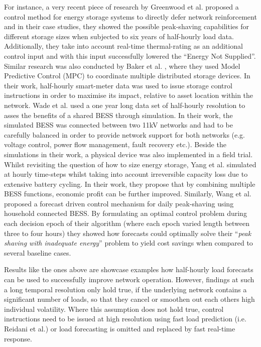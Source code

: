 For instance, a very recent piece of research by Greenwood et al. \cite{Greenwood2017} proposed a control method for energy storage systems to directly defer network reinforcement and in their case studies, they showed the possible peak-shaving capabilities for different storage sizes when subjected to six years of half-hourly load data.
Additionally, they take into account real-time thermal-rating as an additional control input and with this input successfully lowered the ``Energy Not Supplied''.
Similar research was also conducted by Baker et al. \cite{Baker2016a}, where they used Model Predictive Control (MPC) to coordinate multiple distributed storage devices.
In their work, half-hourly smart-meter data was used to issue storage control instructions in order to maximise its impact, relative to asset location within the network.
Wade et al. \cite{Wade2010} used a one year long data set of half-hourly resolution to asses the benefits of a shared BESS through simulation.
In their work, the simulated BESS was connected between two 11kV networks and had to be carefully balanced in order to provide network support for both networks (e.g. voltage control, power flow management, fault recovery etc.).
Beside the simulations in their work, a physical device was also implemented in a field trial.
Whilst revisiting the question of how to size energy storage, Yang et al. \cite{Yang2014} simulated at hourly time-steps whilst taking into account irreversible capacity loss due to extensive battery cycling.
In their work, they propose that by combining multiple BESS functions, economic profit can be further improved.
Similarly, Wang et al. \cite{Wang2014a} proposed a forecast driven control mechanism for daily peak-shaving using household connected BESS.
By formulating an optimal control problem during each decision epoch of their algorithm (where each epoch varied length between three to four hours) they showed how forecasts could optimally solve their ``\textit{peak shaving with inadequate energy}'' problem to yield cost savings when compared to several baseline cases.

Results like the ones above are showcase examples how half-hourly load forecasts can be used to successfully improve network operation.
However, findings at such a long temporal resolution only hold true, if the underlying network contains a significant number of loads, so that they cancel or smoothen out each others high individual volatility.
Where this assumption does not hold true, control instructions need to be issued at high resolution using fast load prediction (i.e. Reidani et al.) or load forecasting is omitted and replaced by fast real-time response.

